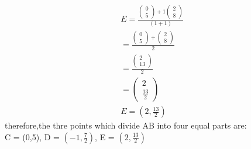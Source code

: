 \documentclass[12pt]{article}
\newcommand{\myvec}[1]{\ensuremath{\begin{pmatrix}#1\end{pmatrix}}}
\begin{document}
\begin{enumerate}
\begin{align}
E = \frac{\myvec{0\\5}+1\myvec{2\\8}}{(1+1)}\\
= \frac{\myvec{0\\5}+\myvec{2\\8}}{2}\\
= \frac{\myvec{2\\13}}{2}\\
 = \myvec{2\\\frac{13}{2}}\\
E = (2,\frac{13}{2})
\end{align}
therefore,the thre points which divide AB into four equal parts are:\\
C = (0,5),
D = $(-1,\frac{7}{2})$,
E = $(2,\frac{13}{2})$
\end{enumerate}
\end{document}
